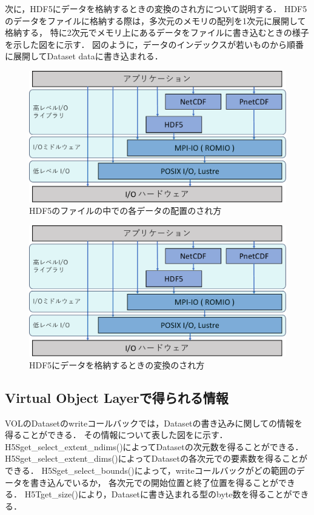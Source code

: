 \documentclass[submit,techrep,noauthor]{ipsj}
\begin{document}
次に，HDF5にデータを格納するときの変換のされ方について説明する．
HDF5のデータをファイルに格納する際は，多次元のメモリの配列を1次元に展開して格納する，
特に2次元でメモリ上にあるデータをファイルに書き込むときの様子を示した図をに示す．
図のように，データのインデックスが若いものから順番に展開してDataset dataに書き込まれる．

\begin{figure}[t]
	\centering
	\includegraphics[page=13,width=\linewidth]{figure-crop.pdf}
	\caption{HDF5のファイルの中での各データの配置のされ方}
	\label{fig:hdf5file}
\end{figure}

\begin{figure}[t]
	\centering
	\includegraphics[page=17,width=\linewidth]{figure-crop.pdf}
	\caption{HDF5にデータを格納するときの変換のされ方}
	\label{fig:hdf5mem2file}
\end{figure}


\subsection{Virtual Object Layerで得られる情報}
VOLのDatasetのwriteコールバックでは，Datasetの書き込みに関しての情報を得ることができる．
その情報について表した図をに示す．
H5Sget\_select\_extent\_ndims()によってDatasetの次元数を得ることができる．
H5Sget\_select\_extent\_dims()によってDatasetの各次元での要素数を得ることができる．
H5Sget\_select\_bounds()によって，writeコールバックがどの範囲のデータを書き込んでいるか，
各次元での開始位置と終了位置を得ることができる．
H5Tget\_size()により，Datasetに書き込まれる型のbyte数を得ることができる．
\end{document}
